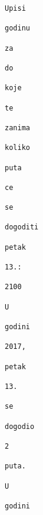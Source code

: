 \documentclass{exam}
\begin{document}
\begin{itemize}
\begin{lstlisting}[caption={Ispis}]
                                                                                                Upisi
                                                                                                godinu
                                                                                                za
                                                                                                do
                                                                                                koje
                                                                                                te
                                                                                                zanima
                                                                                                koliko
                                                                                                puta
                                                                                                ce
                                                                                                se
                                                                                                dogoditi
                                                                                                petak
                                                                                                13.:
                                                                                                2100
                                                                                                U
                                                                                                godini
                                                                                                2017,
                                                                                                petak
                                                                                                13.
                                                                                                se
                                                                                                dogodio
                                                                                                2
                                                                                                puta.
                                                                                                U
                                                                                                godini

\end{lstlisting}
\end{itemize}
\end{document}
